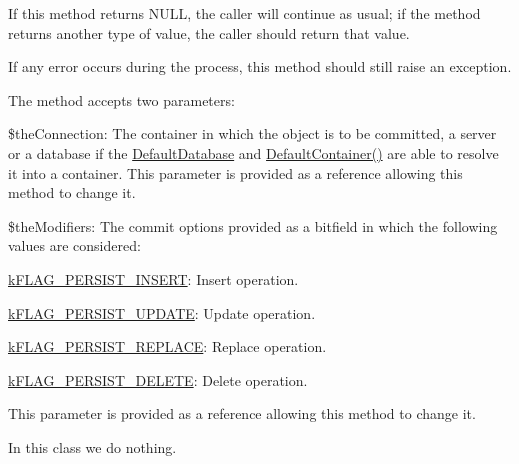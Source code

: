 If this method returns {\ttfamily N\-U\-L\-L}, the caller will continue as usual; if the method returns another type of value, the caller should return that value.

If any error occurs during the process, this method should still raise an exception.

The method accepts two parameters\-:


\begin{DoxyItemize}
\item {\ttfamily \$the\-Connection}\-: The container in which the object is to be committed, a server or a database if the \hyperlink{class_c_persistent_document_a6092e640e36485873b70a79db464e0ff}{Default\-Database} and \hyperlink{class_c_persistent_document_ada019252d242b5a88a26b82a18e29ed6}{Default\-Container()} are able to resolve it into a container. This parameter is provided as a reference allowing this method to change it. 
\item {\ttfamily \$the\-Modifiers}\-: The commit options provided as a bitfield in which the following values are considered\-: 
\begin{DoxyItemize}
\item {\ttfamily \hyperlink{}{k\-F\-L\-A\-G\-\_\-\-P\-E\-R\-S\-I\-S\-T\-\_\-\-I\-N\-S\-E\-R\-T}}\-: Insert operation. 
\item {\ttfamily \hyperlink{}{k\-F\-L\-A\-G\-\_\-\-P\-E\-R\-S\-I\-S\-T\-\_\-\-U\-P\-D\-A\-T\-E}}\-: Update operation. 
\item {\ttfamily \hyperlink{}{k\-F\-L\-A\-G\-\_\-\-P\-E\-R\-S\-I\-S\-T\-\_\-\-R\-E\-P\-L\-A\-C\-E}}\-: Replace operation. 
\item {\ttfamily \hyperlink{}{k\-F\-L\-A\-G\-\_\-\-P\-E\-R\-S\-I\-S\-T\-\_\-\-D\-E\-L\-E\-T\-E}}\-: Delete operation. 
\end{DoxyItemize}This parameter is provided as a reference allowing this method to change it. 
\end{DoxyItemize}

In this class we do nothing.


